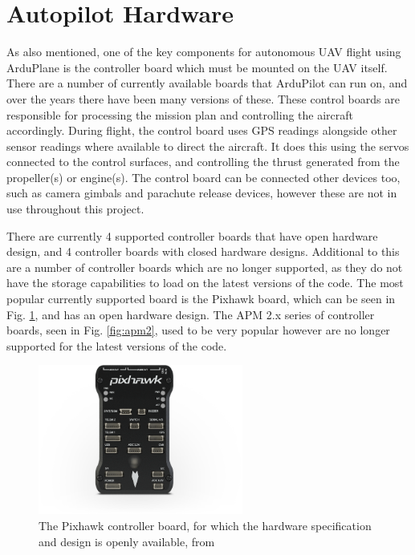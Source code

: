 \section{Autopilot Hardware} 
\label{intro:hardware}

As also mentioned, one of the key components for autonomous UAV flight using ArduPlane is the controller board which must be mounted on the UAV itself. There are a number of currently available boards that ArduPilot can run on, and over the years there have been many versions of these. These control boards are responsible for processing the mission plan and controlling the aircraft accordingly. During flight, the control board uses GPS readings alongside other sensor readings where available to direct the aircraft. It does this using the servos connected to the control surfaces, and controlling the thrust generated from the propeller(s) or engine(s). The control board can be connected other devices too, such as camera gimbals and parachute release devices, however these are not in use throughout this project. 

There are currently 4 supported controller boards that have open hardware design, and 4 controller boards with closed hardware designs. Additional to this are a number of controller boards which are no longer supported, as they do not have the storage capabilities to load on the latest versions of the code. The most popular currently supported board is the Pixhawk board, which can be seen in Fig. \ref{fig:pixhawk}, and has an open hardware design. The APM 2.x series of controller boards, seen in Fig. \ref{fig:apm2}, used to be very popular however are no longer supported for the latest versions of the code.

\begin{figure}[htbp!] 
\centering    
\includegraphics[width=0.6\textwidth]{Pixhawk}
\caption[Pixhawk Controller Board]{The Pixhawk controller board, for which the hardware specification and design is openly available, from \cite{Pixhawk}}
\label{fig:pixhawk}
\end{figure}


